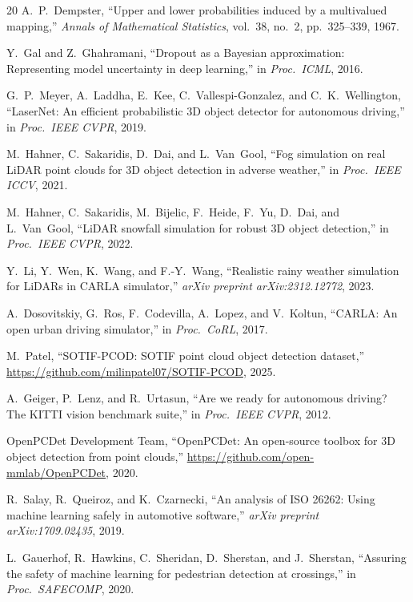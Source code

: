\documentclass[conference]{IEEEtran}
\begin{document}
\begin{thebibliography}{20}
A.~P.~Dempster, ``Upper and lower probabilities induced by a multivalued mapping,'' \emph{Annals of Mathematical Statistics}, vol.~38, no.~2, pp.~325--339, 1967.

Y.~Gal and Z.~Ghahramani, ``Dropout as a Bayesian approximation: Representing model uncertainty in deep learning,'' in \emph{Proc.\ ICML}, 2016.

G.~P.~Meyer, A.~Laddha, E.~Kee, C.~Vallespi-Gonzalez, and C.~K.~Wellington, ``LaserNet: An efficient probabilistic 3D object detector for autonomous driving,'' in \emph{Proc.\ IEEE CVPR}, 2019.

M.~Hahner, C.~Sakaridis, D.~Dai, and L.~Van~Gool, ``Fog simulation on real LiDAR point clouds for 3D object detection in adverse weather,'' in \emph{Proc.\ IEEE ICCV}, 2021.

M.~Hahner, C.~Sakaridis, M.~Bijelic, F.~Heide, F.~Yu, D.~Dai, and L.~Van~Gool, ``LiDAR snowfall simulation for robust 3D object detection,'' in \emph{Proc.\ IEEE CVPR}, 2022.

Y.~Li, Y.~Wen, K.~Wang, and F.-Y.~Wang, ``Realistic rainy weather simulation for LiDARs in CARLA simulator,'' \emph{arXiv preprint arXiv:2312.12772}, 2023.

A.~Dosovitskiy, G.~Ros, F.~Codevilla, A.~Lopez, and V.~Koltun, ``CARLA: An open urban driving simulator,'' in \emph{Proc.\ CoRL}, 2017.

M.~Patel, ``SOTIF-PCOD: SOTIF point cloud object detection dataset,'' \url{https://github.com/milinpatel07/SOTIF-PCOD}, 2025.

A.~Geiger, P.~Lenz, and R.~Urtasun, ``Are we ready for autonomous driving? The KITTI vision benchmark suite,'' in \emph{Proc.\ IEEE CVPR}, 2012.

OpenPCDet Development Team, ``OpenPCDet: An open-source toolbox for 3D object detection from point clouds,'' \url{https://github.com/open-mmlab/OpenPCDet}, 2020.

R.~Salay, R.~Queiroz, and K.~Czarnecki, ``An analysis of ISO 26262: Using machine learning safely in automotive software,'' \emph{arXiv preprint arXiv:1709.02435}, 2019.

L.~Gauerhof, R.~Hawkins, C.~Sheridan, D.~Sherstan, and J.~Sherstan, ``Assuring the safety of machine learning for pedestrian detection at crossings,'' in \emph{Proc.\ SAFECOMP}, 2020.

\end{thebibliography}
\end{document}

